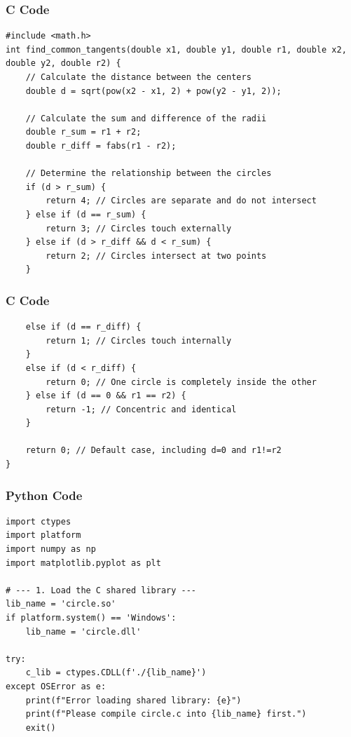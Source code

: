 \documentclass{beamer}
\begin{document}
   
    \begin{frame}[fragile]
        \frametitle{C Code}
        \begin{lstlisting}
#include <math.h>
int find_common_tangents(double x1, double y1, double r1, double x2, double y2, double r2) {
    // Calculate the distance between the centers
    double d = sqrt(pow(x2 - x1, 2) + pow(y2 - y1, 2));

    // Calculate the sum and difference of the radii
    double r_sum = r1 + r2;
    double r_diff = fabs(r1 - r2);

    // Determine the relationship between the circles
    if (d > r_sum) {
        return 4; // Circles are separate and do not intersect
    } else if (d == r_sum) {
        return 3; // Circles touch externally
    } else if (d > r_diff && d < r_sum) {
        return 2; // Circles intersect at two points
    } 

        \end{lstlisting}
    \end{frame}
    
    \begin{frame}[fragile]
        \frametitle{C Code}
        \begin{lstlisting}
    else if (d == r_diff) {
        return 1; // Circles touch internally
    } 
    else if (d < r_diff) {
        return 0; // One circle is completely inside the other
    } else if (d == 0 && r1 == r2) {
        return -1; // Concentric and identical
    }

    return 0; // Default case, including d=0 and r1!=r2
}
        \end{lstlisting}
    \end{frame}
    
   
    
    \begin{frame}[fragile]
        \frametitle{Python Code}
        \begin{lstlisting}
import ctypes
import platform
import numpy as np
import matplotlib.pyplot as plt

# --- 1. Load the C shared library ---
lib_name = 'circle.so'
if platform.system() == 'Windows':
    lib_name = 'circle.dll'

try:
    c_lib = ctypes.CDLL(f'./{lib_name}')
except OSError as e:
    print(f"Error loading shared library: {e}")
    print(f"Please compile circle.c into {lib_name} first.")
    exit()



        \end{lstlisting}
    \end{frame}
    
\end{document}
